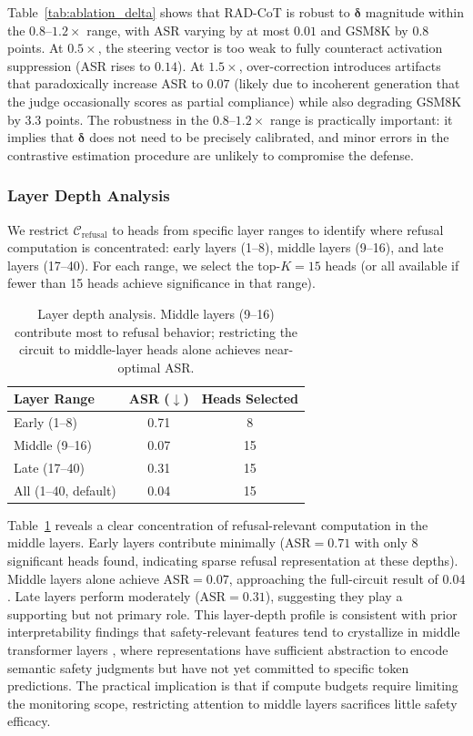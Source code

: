\documentclass[11pt]{article}
\begin{document}
Table~\ref{tab:ablation_delta} shows that RAD-CoT is robust to $\boldsymbol{\delta}$ magnitude within the $0.8$--$1.2\times$ range, with ASR varying by at most $0.01$ and GSM8K by $0.8$ points. At $0.5\times$, the steering vector is too weak to fully counteract activation suppression (ASR rises to $0.14$). At $1.5\times$, over-correction introduces artifacts that paradoxically increase ASR to $0.07$ (likely due to incoherent generation that the judge occasionally scores as partial compliance) while also degrading GSM8K by $3.3$ points. The robustness in the $0.8$--$1.2\times$ range is practically important: it implies that $\boldsymbol{\delta}$ does not need to be precisely calibrated, and minor errors in the contrastive estimation procedure are unlikely to compromise the defense.

\subsubsection{Layer Depth Analysis}

We restrict $\mathcal{C}_{\text{refusal}}$ to heads from specific layer ranges to identify where refusal computation is concentrated: early layers (1--8), middle layers (9--16), and late layers (17--40). For each range, we select the top-$K{=}15$ heads (or all available if fewer than 15 heads achieve significance in that range).

\begin{table}[t]
\centering
\caption{Layer depth analysis. Middle layers (9--16) contribute most to refusal behavior; restricting the circuit to middle-layer heads alone achieves near-optimal ASR.}
\label{tab:ablation_layers}
\begin{tabular}{lcc}
\toprule
\textbf{Layer Range} & \textbf{ASR ($\downarrow$)} & \textbf{Heads Selected} \\
\midrule
Early (1--8) & 0.71 & 8 \\
Middle (9--16) & 0.07 & 15 \\
Late (17--40) & 0.31 & 15 \\
All (1--40, default) & 0.04 & 15 \\
\bottomrule
\end{tabular}
\end{table}

Table~\ref{tab:ablation_layers} reveals a clear concentration of refusal-relevant computation in the middle layers. Early layers contribute minimally (ASR${}=0.71$ with only 8 significant heads found, indicating sparse refusal representation at these depths). Middle layers alone achieve ASR${}=0.07$, approaching the full-circuit result of $0.04$. Late layers perform moderately (ASR${}=0.31$), suggesting they play a supporting but not primary role. This layer-depth profile is consistent with prior interpretability findings that safety-relevant features tend to crystallize in middle transformer layers \citep{arditi2024refusal, li2024inference}, where representations have sufficient abstraction to encode semantic safety judgments but have not yet committed to specific token predictions. The practical implication is that if compute budgets require limiting the monitoring scope, restricting attention to middle layers sacrifices little safety efficacy.
\end{document}
